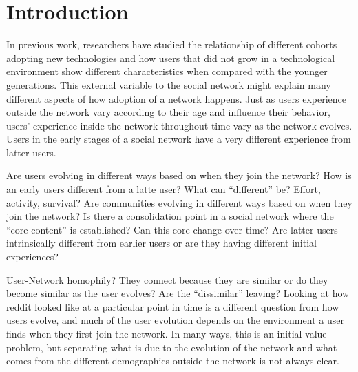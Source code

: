 \section{Introduction}

In previous work, researchers have studied the relationship of different cohorts adopting new technologies and how users that did not grow in a technological environment show different characteristics when compared with the younger generations. This external variable to the social network might explain many different aspects of how adoption of a network happens. Just as users experience outside the network vary according to their age and influence their behavior, users' experience inside the network throughout time vary as the network evolves. Users in the early stages of a social network have a very different experience from latter users.

Are users evolving in different ways based on when they join the network? How is an early users different from a latte user?
What can ``different'' be? Effort, activity, survival?
Are communities evolving in different ways based on when they join the network?
Is there a consolidation point in a social network where the ``core content'' is established? Can this core change over time?
Are latter users intrinsically different from earlier users or are they having different initial experiences?

User-Network homophily? They connect because they are similar or do they become similar as the user evolves? Are the ``dissimilar'' leaving?
Looking at how reddit looked like at a particular point in time is a different question from how users evolve, and much of the user evolution depends on the environment a user finds when they first join the network. In many ways, this is an initial value problem, but separating what is due to the evolution of the network and what comes from the different demographics outside the network is not always clear.

